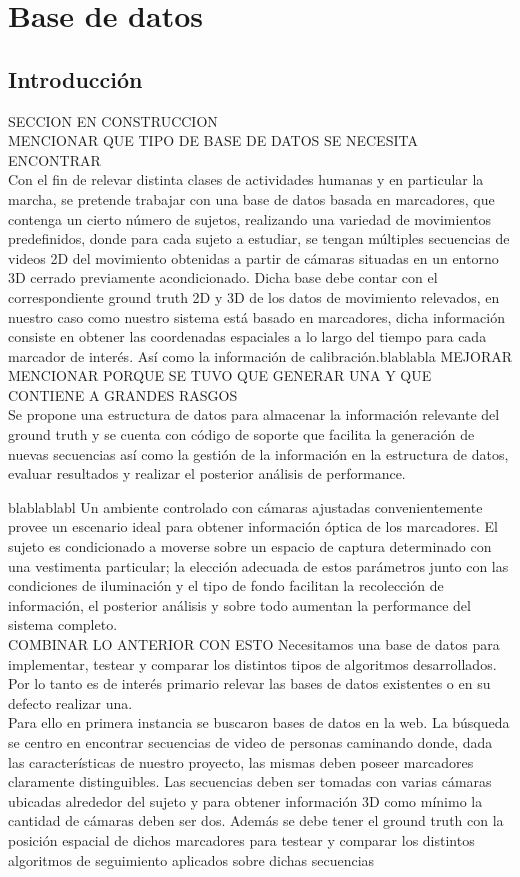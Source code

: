 \section{Base de datos}


\subsection{Introducción} SECCION EN CONSTRUCCION\\
MENCIONAR QUE TIPO DE BASE DE DATOS SE NECESITA ENCONTRAR\\
Con el fin de relevar distinta clases de actividades humanas y en particular la marcha, se pretende trabajar con una base de datos basada en marcadores, que contenga un cierto número de sujetos, realizando una variedad de movimientos predefinidos, donde para cada sujeto a estudiar, se tengan múltiples secuencias de videos 2D del movimiento obtenidas a partir de cámaras situadas en un entorno 3D cerrado previamente acondicionado. Dicha base debe contar con el correspondiente ground truth 2D y 3D de los datos de movimiento relevados, en nuestro caso como nuestro sistema está basado en marcadores, dicha información consiste en obtener las coordenadas espaciales a lo largo del tiempo para cada marcador de interés. Así como la información de calibración.blablabla MEJORAR \\

MENCIONAR PORQUE SE TUVO QUE GENERAR UNA Y QUE CONTIENE A GRANDES RASGOS\\
Se propone una estructura de datos para almacenar la información relevante del ground truth y  se cuenta con código de soporte que facilita la generación de nuevas secuencias así como la gestión de la información en la estructura de datos, evaluar resultados y realizar el  posterior análisis de performance.


blablablabl
Un ambiente controlado con cámaras ajustadas convenientemente provee un escenario ideal para obtener información óptica de los marcadores. El sujeto es condicionado a moverse sobre un espacio de captura determinado con una vestimenta particular; la elección adecuada de estos parámetros junto con las condiciones de iluminación y el tipo de fondo facilitan la recolección de información, el posterior análisis y sobre todo aumentan la performance del sistema completo.
\\COMBINAR LO ANTERIOR CON ESTO
Necesitamos una base de datos para implementar, testear y comparar los distintos tipos de algoritmos desarrollados. Por lo tanto es de interés primario relevar las bases de datos existentes o en su defecto realizar una.\\
Para ello en primera instancia se buscaron bases de datos en la web. La búsqueda se centro en encontrar secuencias de video de personas caminando donde, dada las características de nuestro proyecto, las mismas deben poseer marcadores claramente distinguibles. Las secuencias deben ser tomadas con varias cámaras ubicadas alrededor del sujeto y para obtener información 3D como mínimo la cantidad de cámaras deben ser dos. Además se debe tener el ground truth con la posición espacial de dichos marcadores para testear y comparar los distintos algoritmos de seguimiento aplicados sobre dichas secuencias


